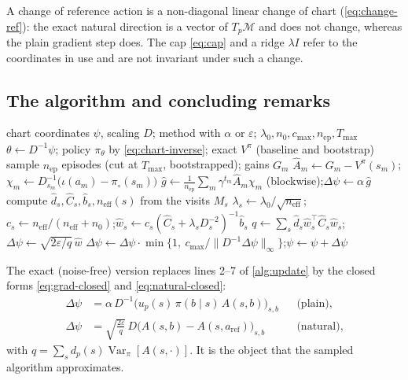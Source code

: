 \documentclass[11pt,a4paper]{article}
\numberwithin{equation}{section}
\theoremstyle{plain}
\theoremstyle{definition}
\theoremstyle{remark}
\newcommand{\T}{^{\top}}
\DeclareMathOperator{\Var}{Var}
\newcommand{\aref}{a_{\mathrm{ref}}}
\newcommand{\pio}{\pi_{\circ}}
\newcommand{\mani}{\mathcal{M}}
\begin{document}
A change of reference action is a non-diagonal linear change of chart (\eqref{eq:change-ref}): the exact natural direction is a vector of $T_p\mani$ and does not change, whereas the plain gradient step does. The cap
\eqref{eq:cap} and a ridge $\lambda I$ refer to the coordinates in use and are not invariant under such a change.

\subsection{The algorithm and concluding remarks}

\begin{algorithm}[t]
\caption{One sampled update (plain or natural).}\label{alg:update}
\begin{algorithmic}[1]
\Require chart coordinates $\psi$, scaling $D$; method with $\alpha$ or $\varepsilon$; $\lambda_0,n_0,c_{\max},n_{\mathrm{ep}},T_{\max}$
\State $\theta\gets D^{-1}\psi$; policy $\pi_\theta$ by \eqref{eq:chart-inverse}; exact $V^\pi$ (baseline and bootstrap)
\State sample $n_{\mathrm{ep}}$ episodes (cut at $T_{\max}$, bootstrapped); gains $G_m$
\State $\hat A_m\gets G_m-V^\pi(s_m)$;\quad $\chi_m\gets D_{s_m}^{-1}\bigl(\iota(a_m)-\pio(s_m)\bigr)$ 
  \State $\hat g\gets\frac1{n_{\mathrm{ep}}}\sum_m\gamma^{t_m}\hat A_m\chi_m$ (blockwise);\quad $\Delta\psi\gets\alpha\,\hat g$ \Comment{\eqref{eq:ghat}}
\Else
   \Comment{\eqref{eq:local-estimates}, \eqref{eq:neff}, \eqref{eq:statewise}}
    \State compute $\hat d_s,\hat C_s,\hat b_s,n_{\mathrm{eff}}(s)$ from the visits $M_s$
    \State $\lambda_s\gets\lambda_0/\sqrt{n_{\mathrm{eff}}}$;\quad $c_s\gets n_{\mathrm{eff}}/(n_{\mathrm{eff}}+n_0)$;\quad $\hat w_s\gets c_s(\hat C_s+\lambda_sD_s^{-2})^{-1}\hat b_s$
  \EndFor
  \State $q\gets\sum_s\hat d_s\hat w_s\T\hat C_s\hat w_s$;\quad $\Delta\psi\gets\sqrt{2\varepsilon/q}\,\hat w$ 
\EndIf
\State $\Delta\psi\gets\Delta\psi\cdot\min\{1,\ c_{\max}/\|D^{-1}\Delta\psi\|_\infty\}$;\quad $\psi\gets\psi+\Delta\psi$ \Comment{\eqref{eq:cap}}
\end{algorithmic}
\end{algorithm}

The exact (noise-free) version replaces lines 2--7 of \cref{alg:update} by the closed forms \eqref{eq:grad-closed} and \eqref{eq:natural-closed}:
\begin{align*}
  \Delta\psi&=\alpha\,D^{-1}\bigl(u_p(s)\,\pi(b\mid s)\,A(s,b)\bigr)_{s,b} &&\text{(plain)},\\
  \Delta\psi&=\sqrt{\frac{2\varepsilon}{q}}\,D\bigl(A(s,b)-A(s,\aref)\bigr)_{s,b} &&\text{(natural)},
\end{align*}
with $q=\sum_sd_p(s)\Var_\pi[A(s,\cdot)]$. It is the object that the sampled algorithm approximates.
\end{document}
